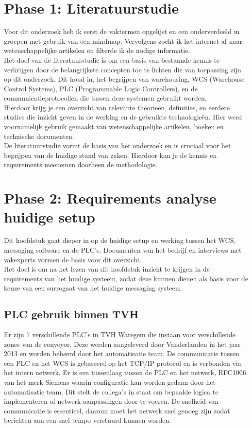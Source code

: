 \section{Phase 1: Literatuurstudie}
Voor dit onderzoek heb ik eerst de vaktermen opgelijst en een onderverdeeld in groepen met gebruik van een mindmap.
Vervolgens zocht ik het internet af naar wetenschappelijke artikelen en filterde ik de nodige informatie.
\\
Het doel van de literatuurstudie is om een basis van bestaande kennis te verkrijgen door de belangrijkste concepten toe te lichten die van toepassing zijn op dit onderzoek. 
Dit houd in, het begrijpen van warehousing, WCS (Warehouse Control Systems), PLC (Programmable Logic Controllers), en de communicatieprotocollen die tussen deze systemen gebruikt worden.
\\
Hierdoor krijg je een overzicht van relevante theorieën, definities, en eerdere studies die inzicht geven in de werking en de gebruikte technologieën.
Hier werd voornamelijk gebruik gemaakt van wetenschappelijke artikelen, boeken en technische documenten.
\\
De literatuurstudie vormt de basis van het onderzoek en is cruciaal voor het begrijpen van de huidige stand van zaken.
Hierdoor kan je de kennis en requirements meenemen doorheen de methodologie.


\section{Phase 2: Requirements analyse huidige setup}
Dit hoofdstuk gaat dieper in op de huidige setup en werking tussen het WCS, messaging software en de PLC's.
Documenten van het bedrijf en interviews met vakexperts vormen de basis voor dit overzicht.
\\
Het doel is om na het lezen van dit hoofdstuk inzicht te krijgen in de requirements van het huidige systeem, 
zodat deze kunnen dienen als basis voor de keuze van een surrogaat van het huidige messaging systeem.
 
\subsection{PLC gebruik binnen TVH}
Er zijn 7 verschillende PLC's in TVH Waregem die instaan voor verschillende zones van de conveyor.
Deze werden aangeleverd door Vanderlanden in het jaar 2013 en worden beheerd door het automatisatie team.
De communicatie tussen een PLC en het WCS is gebaseerd op het TCP/IP protocol en is verbonden via het intern netwerk.
Er is een tussenlaag tussen de PLC en het netwerk, RFC1006 van het merk Siemens waarin configuratie kan worden gedaan door het automatisatie team.
Dit stelt de collega's in staat om bepaalde logica te implementeren of netwerk aanpassingen door te voeren.
De snelheid van communicatie is essentieel, daarom moet het netwerk snel genoeg zijn zodat berichten aan een snel tempo verstuurd kunnen worden.

